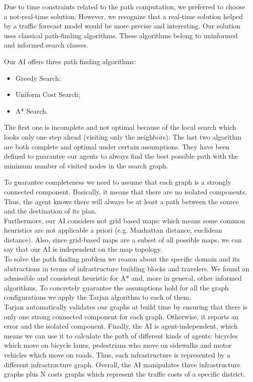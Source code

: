 
Due to time constraints related to the path computation, we preferred to
choose a not-real-time solution. However, we recognize that a real-time solution
helped by a traffic forecast model would be more precise and interesting.
Our solution uses classical path-finding algorithms. These algorithms
belong to uninformed and informed search classes.

Our AI offers three path finding algorithms:
\begin{itemize}
  \item Greedy Search;
  \item Uniform Cost Search;
  \item A* Search.
\end{itemize}

The first one is incomplete and not optimal because of the local search which
looks only one step ahead (visiting
only the neighbors). The last two algorithm are both complete and optimal
under certain assumptions. They have been defined
to guarantee our agents to always find the best possible path with
the minimum number of visited nodes in the search graph.


To guarantee completeness we need to assume that each graph is a strongly
connected component. Basically, it means that there are no isolated
components. Thus, the agent knows there will always be at least a path between
the source and the destination of its plan. %
\\

Furthermore, our AI considers not grid based maps: which means some common
heuristics are not applicable a priori (e.g. Manhattan distance, euclidean
distance). Also, since grid-based maps are a subset of all possible maps, we
can say that our AI is independent on the map topology.
\\

To solve the path finding problem we reason about the specific domain and its
abstractions in terms of infrastructure building blocks and travelers. We
found an admissible and consistent heuristic for A* and, more in general, other
informed algorithms. To concretely guarantee the assumptions hold for all the
graph configurations we apply the Tarjan algorithm to each of them.
\\

Tarjan automatically validates our graphs at build time by ensuring that there
is only one strong connected component for each graph. Otherwise, it reports
an error and the isolated component.
Finally, the AI is agent-independent, which means we can use it to calculate
the path of different kinds of agents: bicycles which move on bicycle lanes,
pedestrians who move on sidewalks and motor vehicles which move on roads.
Thus, each infrastructure is represented by a different infrastructure graph.
Overall, the AI manipulates three infrastructure graphs plus N costs graphs
which represent the traffic costs of a specific district.

